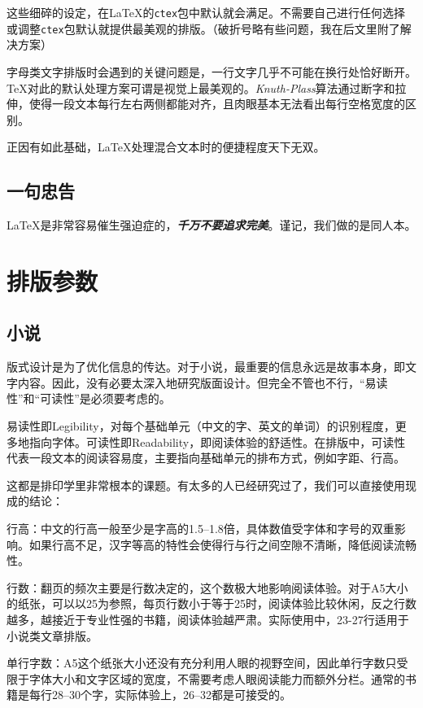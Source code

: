 \documentclass[10pt,openany]{book}
\begin{document}
这些细碎的设定，在\LaTeX 的\texttt{ctex}包中默认就会满足。不需要自己进行任何选择或调整\texttt{ctex}包默认就提供最美观的排版。（破折号略有些问题，我在后文里附了解决方案）

字母类文字排版时会遇到的关键问题是，一行文字几乎不可能在换行处恰好断开。\TeX 对此的默认处理方案可谓是视觉上最美观的。\textit{Knuth-Plass}算法通过断字和拉伸，使得一段文本每行左右两侧都能对齐，且肉眼基本无法看出每行空格宽度的区别。

正因有如此基础，\LaTeX 处理混合文本时的便捷程度天下无双。

\section{一句忠告}

\LaTeX 是非常容易催生强迫症的，\emph{\textbf{千万不要追求完美}}。谨记，我们做的是同人本。

\chapter{排版参数}

\section{小说}

版式设计是为了优化信息的传达。对于小说，最重要的信息永远是故事本身，即文字内容。因此，没有必要太深入地研究版面设计。但完全不管也不行，“易读性”和“可读性”是必须要考虑的。

易读性即Legibility，对每个基础单元（中文的字、英文的单词）的识别程度，更多地指向字体。可读性即Readability，即阅读体验的舒适性。在排版中，可读性代表一段文本的阅读容易度，主要指向基础单元的排布方式，例如字距、行高。

这都是排印学里非常根本的课题。有太多的人已经研究过了，我们可以直接使用现成的结论：

行高：中文的行高一般至少是字高的1.5--1.8倍，具体数值受字体和字号的双重影响。如果行高不足，汉字等高的特性会使得行与行之间空隙不清晰，降低阅读流畅性。

行数：翻页的频次主要是行数决定的，这个数极大地影响阅读体验。对于A5大小的纸张，可以以25为参照，每页行数小于等于25时，阅读体验比较休闲，反之行数越多，越接近于专业性强的书籍，阅读体验越严肃。实际使用中，23-27行适用于小说类文章排版。

单行字数：A5这个纸张大小还没有充分利用人眼的视野空间，因此单行字数只受限于字体大小和文字区域的宽度，不需要考虑人眼阅读能力而额外分栏。通常的书籍是每行28--30个字，实际体验上，26--32都是可接受的。
\end{document}
